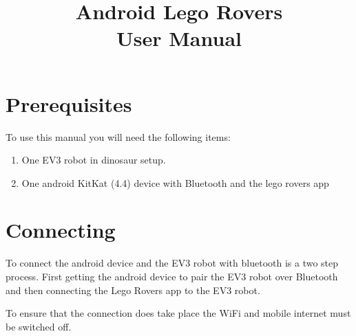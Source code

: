 \documentclass[]{article}   	%
\title{Android Lego Rovers\\User Manual}
\date{}
\begin{document}
\maketitle
\renewcommand\abstractname{}

\section{Prerequisites}
\par{To use this manual you will need the following items:
\begin{enumerate}
	\item One EV3 robot in dinosaur setup.
	\item One android KitKat (4.4) device with Bluetooth and the lego rovers app
\end{enumerate} 
}

\section{Connecting}
\par{To connect the android device and the EV3 robot with bluetooth is a two step process. First getting the android device to pair the EV3 robot over Bluetooth and then connecting the Lego Rovers app to the EV3 robot.}

\par{To ensure that the connection does take place the WiFi and mobile internet must be switched off.}
\end{document}
